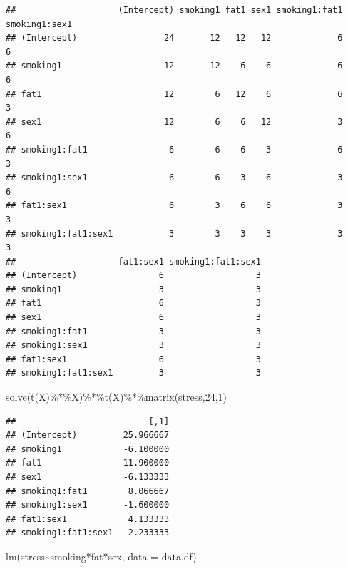 \documentclass[
]{book}
\newenvironment{Shaded}{\begin{snugshade}}{\end{snugshade}}
\newcommand{\AttributeTok}[1]{\textcolor[rgb]{0.77,0.63,0.00}{#1}}
\newcommand{\DecValTok}[1]{\textcolor[rgb]{0.00,0.00,0.81}{#1}}
\newcommand{\FunctionTok}[1]{\textcolor[rgb]{0.00,0.00,0.00}{#1}}
\newcommand{\NormalTok}[1]{#1}
\newcommand{\SpecialCharTok}[1]{\textcolor[rgb]{0.00,0.00,0.00}{#1}}
\begin{document}
\begin{verbatim}
##                    (Intercept) smoking1 fat1 sex1 smoking1:fat1 smoking1:sex1
## (Intercept)                 24       12   12   12             6             6
## smoking1                    12       12    6    6             6             6
## fat1                        12        6   12    6             6             3
## sex1                        12        6    6   12             3             6
## smoking1:fat1                6        6    6    3             6             3
## smoking1:sex1                6        6    3    6             3             6
## fat1:sex1                    6        3    6    6             3             3
## smoking1:fat1:sex1           3        3    3    3             3             3
##                    fat1:sex1 smoking1:fat1:sex1
## (Intercept)                6                  3
## smoking1                   3                  3
## fat1                       6                  3
## sex1                       6                  3
## smoking1:fat1              3                  3
## smoking1:sex1              3                  3
## fat1:sex1                  6                  3
## smoking1:fat1:sex1         3                  3
\end{verbatim}

\begin{Shaded}
\begin{Highlighting}[]
\FunctionTok{solve}\NormalTok{(}\FunctionTok{t}\NormalTok{(X)}\SpecialCharTok{\%*\%}\NormalTok{X)}\SpecialCharTok{\%*\%}\FunctionTok{t}\NormalTok{(X)}\SpecialCharTok{\%*\%}\FunctionTok{matrix}\NormalTok{(stress,}\DecValTok{24}\NormalTok{,}\DecValTok{1}\NormalTok{)}
\end{Highlighting}
\end{Shaded}

\begin{verbatim}
##                          [,1]
## (Intercept)         25.966667
## smoking1            -6.100000
## fat1               -11.900000
## sex1                -6.133333
## smoking1:fat1        8.066667
## smoking1:sex1       -1.600000
## fat1:sex1            4.133333
## smoking1:fat1:sex1  -2.233333
\end{verbatim}

\begin{Shaded}
\begin{Highlighting}[]
\FunctionTok{lm}\NormalTok{(stress}\SpecialCharTok{\textasciitilde{}}\NormalTok{smoking}\SpecialCharTok{*}\NormalTok{fat}\SpecialCharTok{*}\NormalTok{sex, }\AttributeTok{data =}\NormalTok{ data.df)}
\end{Highlighting}
\end{Shaded}
\end{document}
